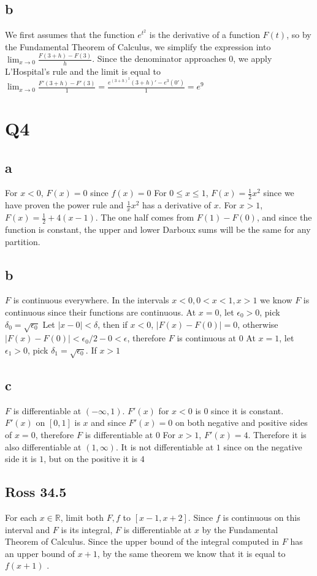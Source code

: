 \documentclass[12pt]{article}
\newcommand{\R}{\mathbb{R}}
\begin{document}
\subsection{b}
We first assumes that the function $e^{t^2}$ is the derivative of a function $F(t)$, so by the Fundamental Theorem of Calculus, we simplify the expression into $\lim_{x \to 0} \frac{F(3+h)-F(3)}{h}$.
Since the denominator approaches 0, we apply L'Hospital's rule and the limit is equal to $\lim_{x \to 0} \frac{F'(3+h)-F'(3)}{1} = \frac{e^{(3+h)^2}(3+h)'-e^3(0')}{1} = e^9$
\newpage


\section{Q4}
\subsection{a}
For $x < 0$, $F(x)=0$ since $f(x)=0$
\newline
For $0 \leq x \leq 1$, $F(x)=\frac{1}{2}x^2$ since we have proven the power rule and $\frac{1}{x}x^2$ has a derivative of
$x$.
\newline
For $x > 1$, $F(x) = \frac{1}{2} + 4(x-1)$. The one half comes from $F(1)-F(0)$, and since the function is constant, the upper and lower Darboux sums will be the same for any partition.

\subsection{b}
$F$ is continuous everywhere. In the intervals $x<0, 0<x<1, x>1$ we know $F$ is continuous since their functions are continuous. At $x=0$, let $\epsilon_0 > 0$, pick $\delta_0 = \sqrt{\epsilon_0}$
Let $|x-0|<\delta$, then if $x<0$, $|F(x)-F(0)|=0$, otherwise $|F(x)-F(0)| < \epsilon_0/2-0 < \epsilon$, therefore $F$ is continuous at 0
\newline
At $x=1$, let $\epsilon_1 > 0$, pick $\delta_1 = \sqrt{\epsilon_0}$. If $x>1$

\subsection{c}
$F$ is differentiable at $(-\infty, 1)$. $F'(x)$ for $x < 0$ is $0$ since it is constant. $F'(x)$ on $[0,1]$ is $x$ and since $F'(x)=0$ on both negative and positive sides of $x=0$, therefore $F$ is differentiable at $0$
\newline
For $x>1$, $F'(x)= 4$. Therefore it is also differentiable at $(1, \infty)$. It is not differentiable at $1$ since on the negative side it is $1$, but on the positive it is $4$
\newpage


\subsection{Ross 34.5}
For each $x \in \R$, limit both $F,f$ to $[x-1,x+2]$. Since $f$ is continuous on this interval and $F$ is its integral, $F$ is differentiable at $x$ by the Fundamental Theorem of Calculus.
\newline
Since the upper bound of the integral computed in $F$ has an upper bound of $x+1$, by the same theorem we know that it is equal to $f(x+1)$ .
\end{document}
